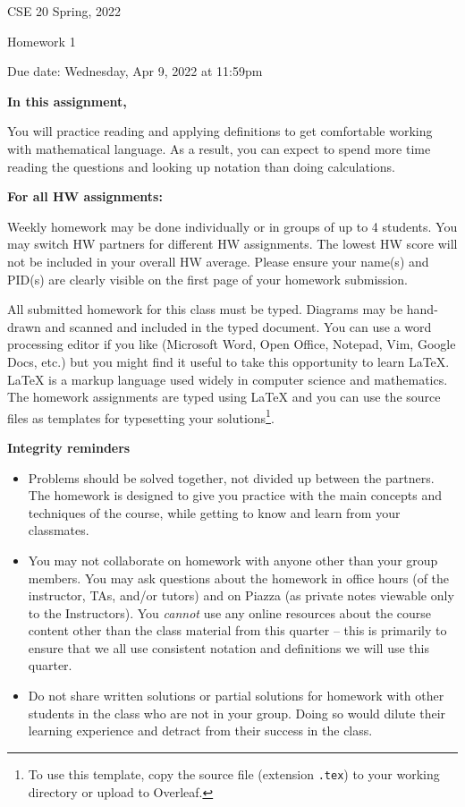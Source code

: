 \documentclass[10pt,letterpaper,unboxed,cm]{article}
\begin{document}
\hfill{CSE 20 Spring, 2022}

\hfill{Homework 1}

\hfill{Due date: Wednesday, Apr 9, 2022 at 11:59pm}



{\bf In this assignment,}

You will practice reading and
applying definitions to get comfortable working with mathematical language. As
a result, you can expect to spend more time reading the questions and looking
up notation than doing calculations.


{\bf For all HW assignments:}

Weekly homework may be done individually or in groups of up to 4 students. 
You may switch HW partners for different HW assignments. 
The lowest HW score will not be included in your overall HW average. 
Please ensure your name(s) and PID(s) are clearly visible on the first page of your homework submission.

All submitted homework for this class must be typed. 
Diagrams may be hand-drawn and scanned and included in the typed document. 
You can use a word processing editor if you like (Microsoft Word, Open Office, Notepad, Vim, Google Docs, etc.) 
but you might find it useful to take this opportunity to learn LaTeX. 
LaTeX is a markup language used widely in computer science and mathematics. 
The homework assignments are typed using LaTeX and you can use the source files 
as templates for typesetting your solutions\footnote{To use this template, copy the source file (extension \texttt{.tex}) 
to your working directory or upload to Overleaf.}.

{\bf Integrity reminders}
\begin{itemize}
\item Problems should be solved together, not divided up between the partners. The homework is
designed to give you practice with the main concepts and techniques of the course, 
while getting to know and learn from your classmates.
\item You may not collaborate on homework with anyone other than your group members.
You may ask questions about the homework in office hours (of the instructor, TAs, and/or tutors) and 
on Piazza (as private notes viewable only to the Instructors).  
You \emph{cannot} use any online resources about the course content other than the class material 
from this quarter -- this is primarily to ensure that we all use consistent notation and
definitions we will use this quarter.
\item Do not share written solutions or partial solutions for homework with 
other students in the class who are not in your group. Doing so would dilute their learning 
experience and detract from their success in the class.
\end{itemize}
\end{document}
